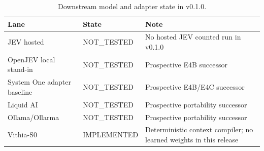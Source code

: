 \begin{table}[t]
\centering
\small
\begin{tabular}{lll}
\toprule
Lane & State & Note \\
\midrule
JEV hosted & NOT\_TESTED & No hosted JEV counted run in v0.1.0 \\
OpenJEV local stand-in & NOT\_TESTED & Prospective E4B successor \\
System One adapter baseline & NOT\_TESTED & Prospective E4B/E4C successor \\
Liquid AI & NOT\_TESTED & Prospective portability successor \\
Ollama/Ollarma & NOT\_TESTED & Prospective portability successor \\
Vithia-S0 & IMPLEMENTED & Deterministic context compiler; no learned weights in this release \\
\bottomrule
\end{tabular}
\caption{Downstream model and adapter state in v0.1.0.}
\label{tab:models}
\end{table}
